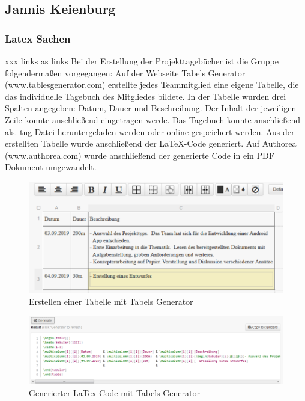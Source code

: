 \subsection{Jannis Keienburg}

\subsubsection{Latex Sachen}

xxx links as links
Bei der Erstellung der Projekttagebücher ist die Gruppe folgendermaßen vorgegangen: 
Auf der Webseite Tabels Generator (www.tablesgenerator.com) erstellte jedes Teammitglied eine eigene Tabelle, die das individuelle Tagebuch des Mitgliedes bildete. In der Tabelle wurden drei Spalten angegeben: Datum, Dauer und Beschreibung. Der Inhalt der jeweiligen Zeile konnte anschließend eingetragen werde. Das Tagebuch konnte anschließend als. tng Datei heruntergeladen werden oder online gespeichert werden. Aus der erstellten Tabelle wurde anschließend der LaTeX-Code generiert. Auf Authorea (www.authorea.com) wurde anschließend der generierte Code in ein PDF Dokument umgewandelt. 

\begin{figure}[!h]
	\includegraphics[scale=1]{img/tabels-generator-erstellen}
	\caption[Erstellen einer Tabelle mit Tabels Generator]{Erstellen einer Tabelle mit Tabels Generator\footnotemark}
\end{figure}

\begin{figure}[!h]
	\includegraphics[scale=1]{img/tables-generator-generate}
	\caption[Generierter LaTex Code mit Tabels Generator]{Generierter LaTex Code mit Tabels Generator\footnotemark}
\end{figure}

